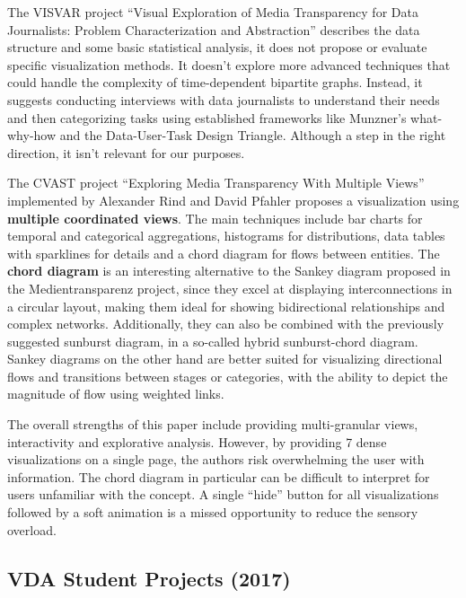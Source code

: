 \documentclass{vgtc}
\begin{document}
\medskip

The VISVAR project ``Visual Exploration of Media Transparency for Data Journalists: Problem Characterization and Abstraction'' \cite{aigner2016visual} describes the data structure and some basic statistical analysis, it does not propose or evaluate specific visualization methods. It doesn't explore more advanced techniques that could handle the complexity of time-dependent bipartite graphs. Instead, it suggests conducting interviews with data journalists to understand their needs and then categorizing tasks using established frameworks like Munzner's what-why-how and the Data-User-Task Design Triangle. Although a step in the right direction, it isn't relevant for our purposes.

\medskip

The CVAST project ``Exploring Media Transparency With Multiple Views'' \cite{rind2016exploring} implemented by Alexander Rind and David Pfahler \cite{gitmtdb2} proposes a visualization using \textbf{multiple coordinated views}. The main techniques include bar charts for temporal and categorical aggregations, histograms for distributions, data tables with sparklines for details and a chord diagram for flows between entities. The \textbf{chord diagram} is an interesting alternative to the Sankey diagram proposed in the Medientransparenz project, since they excel at displaying interconnections in a circular layout, making them ideal for showing bidirectional relationships and complex networks. Additionally, they can also be combined with the previously suggested sunburst diagram, in a so-called hybrid sunburst-chord diagram. Sankey diagrams on the other hand are better suited for visualizing directional flows and transitions between stages or categories, with the ability to depict the magnitude of flow using weighted links.

The overall strengths of this paper include providing multi-granular views, interactivity and explorative analysis. However, by providing 7 dense visualizations on a single page, the authors risk overwhelming the user with information. The chord diagram in particular can be difficult to interpret for users unfamiliar with the concept. A single ``hide'' button for all visualizations followed by a soft animation is a missed opportunity to reduce the sensory overload.

\subsection{VDA Student Projects (2017)}
\end{document}
